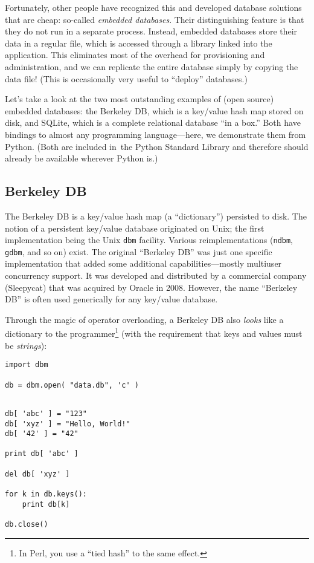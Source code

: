 Fortunately, other people have recognized this and developed database
solutions that are cheap: so-called \emph{embedded databases}.  Their
distinguishing feature is that they do not run in a separate process.
Instead, embedded databases store their data in a regular file, which
is accessed through a library linked into the application. This
eliminates most of the overhead for provisioning and administration,
and we can replicate the entire database simply by copying the data
file! (This is occasionally very useful to ``deploy'' databases.)

Let's take a look at the two most outstanding examples of (open
source) embedded databases: the Berkeley DB, which is a key/value hash
map stored on disk, and SQLite, which is a complete relational
database ``in a box.'' Both have bindings to almost any programming
language---here, we demonstrate them from Python. (Both are included
in~the Python Standard Library and therefore should already be
available wherever Python is.)

\vspace*{-6pt}
\subsection{Berkeley DB}

The Berkeley DB is a key/value hash map (a ``dictionary'') persisted
to disk. The notion of a persistent key/value database originated on
Unix; the first implementation being the Unix \texttt{dbm} facility.
Various reimplementations (\texttt{ndbm}, \texttt{gdbm}, and so on)
exist. The original ``Berkeley DB'' was just one specific
implementation that added some additional capabilities---mostly
multiuser concurrency support. It was developed and distributed by a
commercial company (Sleepycat) that was acquired by Oracle in 2008.
However, the name ``Berkeley DB'' is often used generically for any
key/value database.

Through the magic of operator overloading, a Berkeley DB also
\emph{looks} like a dictionary to the programmer\footnote{In Perl, you
  use a ``tied hash'' to the same effect.}  (with the requirement that
keys and values must be \emph{strings}):

\begin{verbatim}
import dbm

db = dbm.open( "data.db", 'c' )
\end{verbatim}\pagebreak

\begin{verbatim}

db[ 'abc' ] = "123"
db[ 'xyz' ] = "Hello, World!"
db[ '42' ] = "42"
    
print db[ 'abc' ]

del db[ 'xyz' ]

for k in db.keys():
    print db[k]

db.close()
\end{verbatim}

